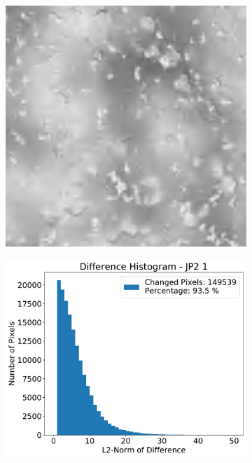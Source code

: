 \begin{figure}[htb]
    \centering
    \begin{subfigure}[b]{0.48\textwidth}
        \centering
        \includegraphics[width=\textwidth]{doc/thesis/0_figures/compare_quality/set1/jp2_1_center}
        \caption{}
        \label{fig:img_quality_comp_jp2_1_center_orig}
    \end{subfigure}
    \begin{subfigure}[b]{0.48\textwidth}
        \centering
        \includegraphics[width=\textwidth]{doc/thesis/0_figures/compare_quality/set1/jp2_1_center_diff_histogram}

\end{subfigure}
\end{figure}
